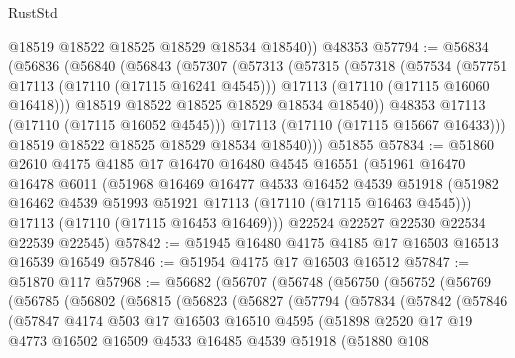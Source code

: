 \begin{lexlean}{RustStd}
\begin{coremodule}
        @18519
        @18522
        @18525
        @18529
        @18534
        @18540))
    @48353
@57794 := @56834
    (@56836
      (@56840
        (@56843
          (@57307
            (@57313
              (@57315
                (@57318
                  (@57534
                    (@57751 @17113 (@17110 (@17115 @16241 @4545)))
                    @17113
                    (@17110 (@17115 @16060 @16418)))
                  @18519
                  @18522
                  @18525
                  @18529
                  @18534
                  @18540))
              @48353
              @17113
              (@17110 (@17115 @16052 @4545)))
            @17113
            (@17110 (@17115 @15667 @16433)))
          @18519
          @18522
          @18525
          @18529
          @18534
          @18540)))
    @51855
@57834 := @51860
    @2610
    @4175
    @4185
    @17
    @16470
    @16480
    @4545
    @16551
    (@51961
      @16470
      @16478
      @6011
      (@51968
        @16469
        @16477
        @4533
        @16452
        @4539
        @51918
        (@51982 @16462 @4539 @51993 @51921 @17113 (@17110 (@17115 @16463 @4545)))
        @17113
        (@17110 (@17115 @16453 @16469)))
      @22524
      @22527
      @22530
      @22534
      @22539
      @22545)
@57842 := @51945 @16480 @4175 @4185 @17 @16503 @16513 @16539 @16549
@57846 := @51954 @4175 @17 @16503 @16512
@57847 := @51870 @117
@57968 := @56682
    (@56707
      (@56748
        (@56750
          (@56752
            (@56769
              (@56785
                (@56802
                  (@56815
                    (@56823
                      (@56827
                        (@57794
                          (@57834
                            (@57842
                              (@57846
                                (@57847
                                  @4174
                                  @503
                                  @17
                                  @16503
                                  @16510
                                  @4595
                                  (@51898
                                    @2520
                                    @17
                                    @19
                                    @4773
                                    @16502
                                    @16509
                                    @4533
                                    @16485
                                    @4539
                                    @51918
                                    (@51880
                                      @108

\end{coremodule}
\end{lexlean}
